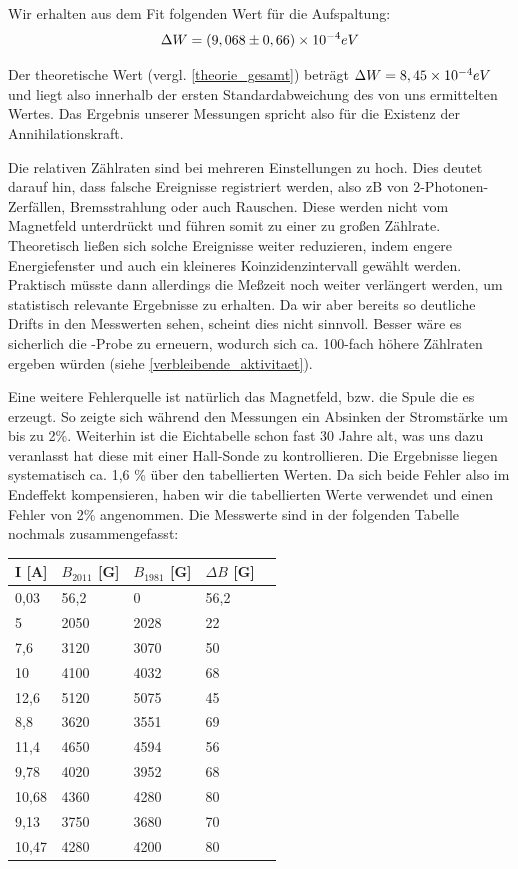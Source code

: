 Wir erhalten aus dem Fit folgenden Wert für die Aufspaltung:
\begin{equation*}
 \Delta W = (9,068 \pm 0,66) \times 10^{-4} eV
\end{equation*}

Der theoretische Wert (vergl. \ref{theorie_gesamt}) beträgt $\Delta W = 8,45\times 10^{-4} eV$ und liegt also innerhalb der ersten Standardabweichung des von uns ermittelten Wertes. Das Ergebnis unserer Messungen spricht also für die Existenz der Annihilationskraft.

Die relativen Zählraten sind bei mehreren Einstellungen zu hoch. Dies deutet darauf hin, dass falsche Ereignisse registriert werden, also zB von 2-Photonen-Zerfällen, Bremsstrahlung oder auch Rauschen. Diese werden nicht vom Magnetfeld unterdrückt und führen somit zu einer zu großen Zählrate. Theoretisch ließen sich solche Ereignisse weiter reduzieren, indem engere Energiefenster und auch ein kleineres Koinzidenzintervall gewählt werden. Praktisch müsste dann allerdings die Meßzeit noch weiter verlängert werden, um statistisch relevante Ergebnisse zu erhalten. Da wir aber bereits so deutliche Drifts in den Messwerten sehen, scheint dies nicht sinnvoll. Besser wäre es sicherlich die \Na-Probe zu erneuern, wodurch sich ca. 100-fach höhere Zählraten ergeben würden (siehe \ref{verbleibende_aktivitaet}).

Eine weitere Fehlerquelle ist natürlich das Magnetfeld, bzw. die Spule die es erzeugt. So zeigte sich während den Messungen ein Absinken der Stromstärke um bis zu 2\%. Weiterhin ist die Eichtabelle schon fast 30 Jahre alt, was uns dazu veranlasst hat diese mit einer Hall-Sonde zu kontrollieren. Die Ergebnisse liegen systematisch ca. 1,6 \% über den tabellierten Werten. Da sich beide Fehler also im Endeffekt kompensieren, haben wir die tabellierten Werte verwendet und einen Fehler von 2\% angenommen. Die Messwerte sind in der folgenden Tabelle nochmals zusammengefasst: 

\begin{center}
\begin{tabular}{lllll}
\toprule
I [A] & $B_{2011}$ [G] & $B_{1981}$ [G] & $\Delta B$ [G] \\
\midrule
0,03&	56,2&	0&	56,2\\
5&	2050&	2028&	22\\
7,6&	3120&	3070&	50\\
10&	4100&	4032&	68\\
12,6&	5120&	5075&	45\\
8,8&	3620&	3551&	69\\
11,4&	4650&	4594&	56\\
9,78&	4020&	3952&	68\\
10,68&	4360&	4280&	80\\
9,13&	3750&	3680&	70\\
10,47&	4280&	4200&	80\\
\bottomrule
\end{tabular}
\end{center}